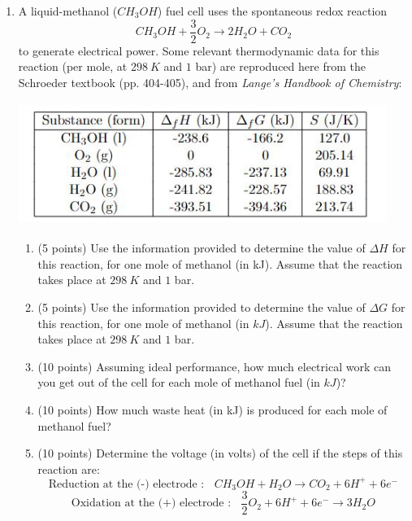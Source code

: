 \documentclass[fleqn]{article}
\begin{document}
\begin{enumerate}
    \pagebreak

    \item A liquid-methanol ($CH_3 OH$) fuel cell uses the spontaneous redox reaction
    $$
      CH_3 OH+\dfrac{3}{2} O_2 \longrightarrow 2H_2 O+CO_2
    $$
    to generate electrical power. Some relevant thermodynamic data for this reaction (per mole, at
    2$98 ~ K$ and $1$ bar) are reproduced here from the Schroeder textbook (pp. 404-405), and from
    \emph{Lange's Handbook of Chemistry}:
    \begin{center}
      \includegraphics[height=4cm, width=12cm]{question7.JPG}
    \end{center}
    \begin{enumerate}
      \item (5 points) Use the information provided to determine the value of $\Delta H$ for this reaction, for
      one mole of methanol (in kJ). Assume that the reaction takes place at $298 ~ K$ and $1$ bar.

      \item (5 points) Use the information provided to determine the value of $\Delta G$ for this reaction, for
      one mole of methanol (in $kJ$). Assume that the reaction takes place at $298 ~ K$ and $1$ bar.


      \item (10 points) Assuming ideal performance, how much electrical work can you get out of the
      cell for each mole of methanol fuel (in $kJ$)?


      \item (10 points) How much waste heat (in kJ) is produced for each mole of methanol fuel?


      \item (10 points) Determine the voltage (in volts) of the cell if the steps of this reaction are:
      $$
        \text{Reduction at the (-) electrode :} ~~~~ CH_3 OH+H_2 O \longrightarrow CO_2+6H^++6e^-
      $$
      $$
        \text{Oxidation at the (+) electrode :} ~~~~ \dfrac{3}{2} O_2+6H^+ +6e^- \longrightarrow 3H_2 O 
      $$

    \end{enumerate}



\end{enumerate}
\end{document}
